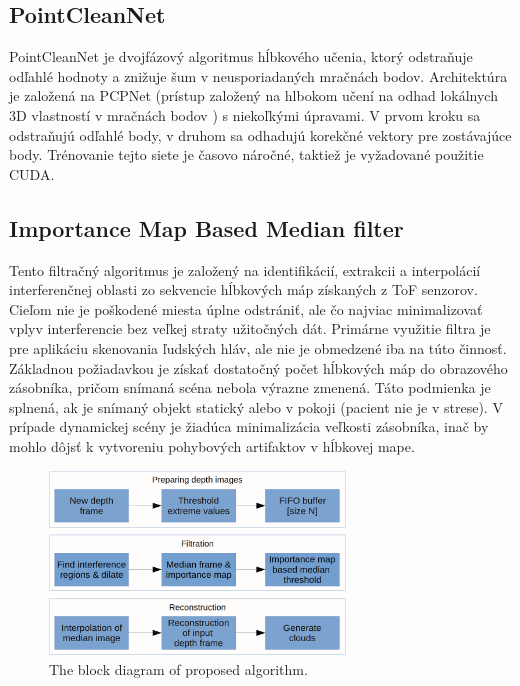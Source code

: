 \subsection{PointCleanNet}
PointCleanNet je dvojfázový algoritmus hĺbkového učenia, ktorý odstraňuje odľahlé hodnoty a znižuje šum v neusporiadaných mračnách bodov. Architektúra je založená na PCPNet (prístup založený na hlbokom učení na odhad lokálnych 3D vlastností v mračnách bodov \cite{Guitrero}) s niekoľkými úpravami. V prvom kroku sa odstraňujú odľahlé body, v druhom sa odhadujú korekčné vektory pre zostávajúce body. Trénovanie tejto siete je časovo náročné, taktiež je vyžadované použitie CUDA.

\subsection{Importance Map Based Median filter}

Tento filtračný algoritmus je založený na identifikácií, extrakcii a interpolácií interferenčnej oblasti zo sekvencie hĺbkových máp získaných z ToF senzorov. Cieľom nie je poškodené miesta úplne odstrániť, ale čo najviac minimalizovať vplyv interferencie bez veľkej straty užitočných dát. Primárne využitie filtra je pre aplikáciu skenovania ľudských hláv, ale nie je obmedzené iba na túto činnosť. Základnou požiadavkou je získať dostatočný počet hĺbkových máp do obrazového zásobníka, pričom snímaná scéna nebola výrazne zmenená. Táto podmienka je splnená, ak je snímaný objekt statický alebo v pokoji (pacient nie je v strese). V prípade dynamickej scény je žiadúca minimalizácia veľkosti zásobníka, inač by mohlo dôjsť k vytvoreniu pohybových artifaktov v hĺbkovej mape.

\begin{figure}[h]
	\centering
	\includegraphics[width=0.7\textwidth]{figures/algorithm.png}
	\caption{The block diagram of proposed algorithm.}
	\label{fig:algorithm}
\end{figure}

